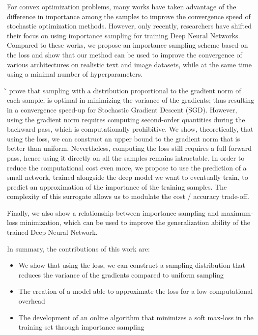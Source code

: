 \documentclass{article}
\newcommand{\citet}[1]{\citeauthor{#1} ̃\shortcite{#1}}
\begin{document}
For convex optimization problems, many works
\cite{bordes2005fast,zhao2015stochastic,needell2014stochastic,canevet-et-al-2016,richtarik2013optimal}
have taken advantage of the difference in importance among the samples to
improve the convergence speed of stochastic optimization methods. However, only
recently, researchers \cite{alain2015variance,loshchilov2015online} have
shifted their focus on using importance sampling for training Deep Neural
Networks. Compared to these works, we propose an importance sampling scheme
based on the loss and show that our method can be used to improve the
convergence of various architectures on realistic text and image datasets, while
at the same time using a minimal number of hyperparameters.

\citet{zhao2015stochastic} prove that sampling with a distribution proportional
to the gradient norm of each sample, is optimal in minimizing the variance of
the gradients; thus resulting in a convergence speed-up for Stochastic Gradient
Descent (SGD). However, using the gradient norm requires computing second-order
quantities during the backward pass, which is computationally prohibitive. We
show, theoretically, that using the loss, we can construct an upper bound to
the gradient norm that is better than uniform. Nevertheless, computing the loss
still requires a full forward pass, hence using it directly on all the samples
remains intractable. In order to reduce the computational cost even more, we
propose to use the prediction of a small network, trained alongside the deep
model we want to eventually train, to predict an approximation of the
importance of the training samples. The complexity of this surrogate allows us
to modulate the cost / accuracy trade-off.

Finally, we also show a relationship between importance sampling and
maximum-loss minimization, which can be used to improve the
generalization ability of the trained Deep Neural Network.

In summary, the contributions of this work are:
\begin{itemize}
    \item We show that using the loss, we can construct a sampling distribution
        that reduces the variance of the gradients compared to uniform sampling
    \item The creation of a model able to approximate the loss for a
      low computational overhead
    \item The development of an online algorithm that minimizes a soft
      max-loss in the training set through importance sampling
\end{itemize}
\end{document}
